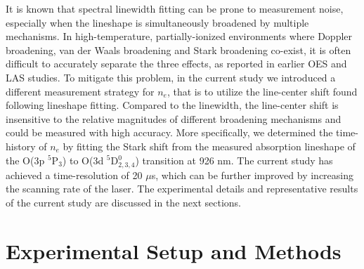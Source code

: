 \documentclass[12pt]{iopart}
\begin{document}
It is known that spectral linewidth fitting can be prone to measurement noise, especially when the lineshape is simultaneously broadened by multiple mechanisms. In high-temperature, partially-ionized environments where Doppler broadening, van der Waals broadening and Stark broadening co-exist, it is often difficult to accurately separate the three effects, as reported in earlier OES\cite{xingxingwang2018,Liebeskind1993b} and LAS\cite{Griem1964} studies. To mitigate this problem, in the current study we introduced a different measurement strategy for $n_e$, that is to utilize the line-center shift found following lineshape fitting. Compared to the linewidth, the line-center shift is insensitive to the relative magnitudes of different broadening mechanisms and could be measured with high accuracy. More specifically, we determined the time-history of $n_e$ by fitting the Stark shift from the measured absorption lineshape of the O(3p $^5$P$_{3}$) to O(3d $^5$D$_{2,3,4}^0$) transition at 926 nm. The current study has achieved a time-resolution of 20 $\mu$s, which can be further improved by increasing the scanning rate of the laser. The experimental details and representative results of the current study are discussed in the next sections.

\section{Experimental Setup and Methods}
\end{document}
